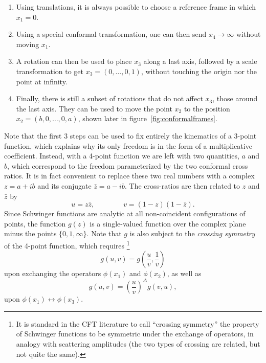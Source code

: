 \documentclass[a4paper,12pt]{article}
\numberwithin{equation}{section}
\begin{document}
\begin{enumerate}

\item
Using translations, it is always possible to choose a reference frame in which $x_1 = 0$.

\item
Using a special conformal transformation, one can then send $x_4 \to \infty$ without moving $x_1$.

\item
A rotation can then be used to place $x_3$ along a last axis, followed by a scale transformation to get $x_3 = (0, \ldots, 0, 1)$, without touching the origin nor the point at infinity.

\item
Finally, there is still a subset of rotations that do not affect $x_3$, those around the last axis. They can be used to move the point $x_2$ to the position $x_2 = (b, 0, \ldots, 0, a)$, shown later in figure~\ref{fig:conformalframes}.

\end{enumerate}
%
Note that the first 3 steps can be used to fix entirely the kinematics of a 3-point function, which explains why its only freedom is in the form of a multiplicative coefficient. Instead, with a 4-point function we are left with two quantities, $a$ and $b$, which correspond to the freedom parameterized by the two conformal cross ratios.
It is in fact convenient to replace these two real numbers with a complex $z = a + i b$ and its conjugate $\bar{z} = a - i b$.
The cross-ratios are then related to $z$ and $\bar{z}$ by
\begin{equation}
	u = z \bar{z},
	\qquad\qquad
	v = (1 - z) (1 - \bar{z}).
\end{equation}
Since Schwinger functions are analytic at all non-coincident configurations of points, the function $g(z)$ is a single-valued function over the complex plane minus the points $\{ 0, 1, \infty \}$. Note that $g$ is also subject to the \emph{crossing symmetry} of the 4-point function, which requires%
%
\footnote{It is standard in the CFT literature to call ``crossing symmetry'' the property of Schwinger functions to be symmetric under the exchange of operators, in analogy with scattering amplitudes (the two types of crossing are related, but not quite the same).}
%
\begin{equation}
	g(u, v) =
	g\left( \frac{u}{v}, \frac{1}{v} \right)
\end{equation}
upon exchanging the operators $\phi(x_1)$ and $\phi(x_2)$, as well as
\begin{equation}
	g(u,v) = \left( \frac{u}{v} \right)^\Delta g(v, u),
\end{equation}
upon $\phi(x_1) \leftrightarrow \phi(x_3)$.
\end{document}
